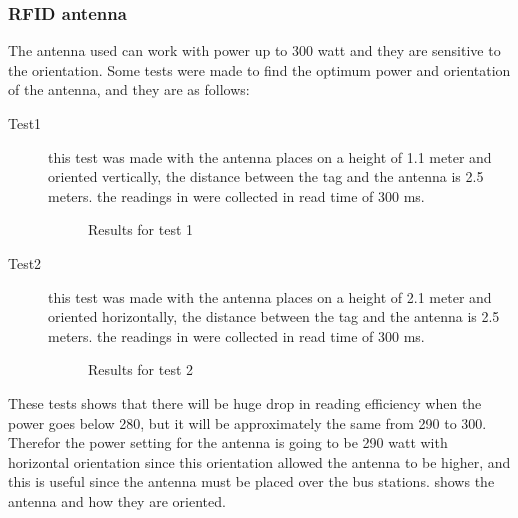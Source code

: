 \documentclass[a4paper,twoside]{IEEEtran}
\begin{document}
\subsubsection{RFID antenna}
The antenna used can work with power up to 300 watt and they are sensitive to the orientation. Some tests were made to find the optimum power and orientation of the antenna, and they are as follows:
\begin{description}
\item[Test1] 
this test was made with the antenna places on a height of 1.1 meter and oriented vertically, the distance between the tag and the antenna is 2.5 meters. the readings in  were collected in read time of 300 ms.
\begin{figure}[h]
\centering
{}
\caption{Results for test 1}
\label{read1}
\end{figure}
\item[Test2] 
this test was made with the antenna places on a height of 2.1 meter and oriented horizontally, the distance between the tag and the antenna is 2.5 meters. the readings in  were collected in read time of 300 ms.
\begin{figure}[h]
\centering
{}
\caption{Results for test 2}
\label{read2}
\end{figure}

\end{description}
These tests shows that there will be huge drop in reading efficiency when the power goes below 280, but it will be approximately the same from 290 to 300. Therefor the power setting for the antenna is going to be 290 watt with horizontal orientation since this orientation allowed the antenna to be higher, and this is useful since the antenna must be placed over the bus stations.  shows the antenna and how they are oriented.
\end{document}
